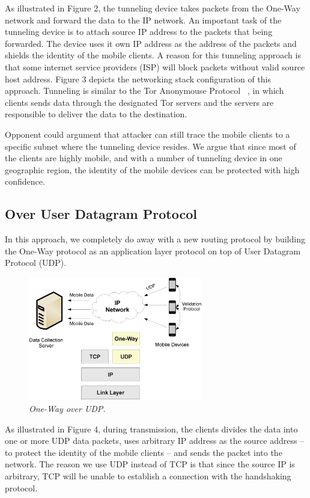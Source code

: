As illustrated in Figure 2, the tunneling device takes packets from the One-Way
network and forward the
data to the IP network. An important task of the tunneling device is to attach
source IP address to the packets that being forwarded. The device uses it own
IP address as the address of the packets and shields the identity of the mobile
clients. A reason for this tunneling approach is that some internet service
providers (ISP) will block packets without valid source host address. Figure 3
depicts the networking stack configuration of this approach. Tunneling is
similar to the Tor Anonymouse Protocol ~\cite{Tor}, in which clients sends data
through the designated Tor servers and the servers are responsible to deliver
the data to the destination.

Opponent could argument that attacker can still trace the mobile clients to a
specific subnet where the tunneling device resides. We argue that since most of
the clients are highly mobile, and with a number of tunneling device in one
geographic region, the identity of the mobile devices can be protected with high
confidence.

\subsection{Over User Datagram Protocol}
In this approach, we completely do away with a new routing protocol by building
the One-Way protocol as an application layer protocol on top of User Datagram
Protocol (UDP).

\begin{figure}[h]
\begin{center}
\includegraphics[width=3in]{figure4.eps}
\caption{\small \sl One-Way over UDP.\label{fig:Stupendous}}
\end{center}
\end{figure}

As illustrated in Figure 4, during transmission, the clients divides the data
into one or more UDP data packets, uses arbitrary IP address as the source
address -- to protect the identity of the mobile clients -- and sends the
packet into the network. The reason we use UDP instead of TCP is that since
the source IP is arbitrary, TCP will be unable to
establish a connection with the handshaking protocol.

